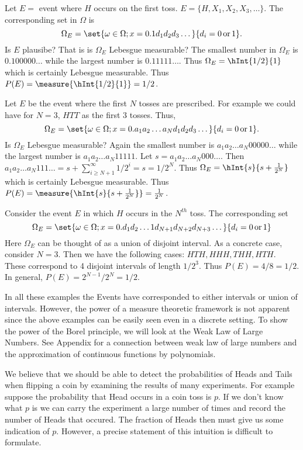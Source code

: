 \begin{Example}
    Let $E = $ event where $H$ occurs on the first toss.
    $E = \lbrace H, X_1, X_2, X_3,\dots \rbrace$. The corresponding set in $\Omega$ is 
    \[\Omega_{E} = \set{\omega\in\Omega; x=0.1d_1d_2d_3\dots}{d_i = 0\,\text{or}\,1}.\]
    Is $E$ plausibe? That is is $\Omega_{E}$ Lebesgue measurable? The smallest number in
    $\Omega_{E}$ is $0.100000\dots$ while the largest number is $0.11111\dots$. Thus
    $\Omega_E = \hInt{1/2}{1}$ which is certainly Lebesgue measurable. Thus $P(E) =
    \measure{\hInt{1/2}{1}} = 1/2$.
\end{Example}
\begin{Example}
    Let $E$ be the event where the first $N$ tosses are prescribed. For example we could have for
    $N=3$, $HTT$ as the first $3$ tosses. Thus,
    \[\Omega_{E} = \set{\omega\in\Omega; x=0.a_1a_2\dots a_{N}d_1d_2d_3\dots}{d_i =
	    0\,\text{or}\,1}.\]
    Is $\Omega_{E}$ Lebesgue measurable? Again the smallest number is $a_1a_2\dots a_N
    00000\dots$ while the largest number is $a_1a_2\dots a_N 11111$. Let $s = a_1a_2\dots
    a_N000\dots$. Then $a_1a_2\dots a_N 111\dots = s + \sum\limits_{i \geq N+1}^{\infty}1/2^{i} = s
    = 1/2^N$. Thus $\Omega_{E} = \hInt{s}{s+\frac{1}{2^N}}$ which is certainly Lebesgue
    measurable. Thus $P(E) = \measure{\hInt{s}{s+\frac{1}{2^N}}} = \frac{1}{2^N}$.
\end{Example}

\begin{Example}
    Consider the event $E$ in which $H$ occurs in the $N^{th}$ toss. The corresponding set 
    \[\Omega_{E} = \set{\omega\in\Omega; x=0.d_1d_2\dots 1 d_{N+1}d_{N+2}d_{N+3}\dots}{d_i =
	    0\,\text{or}\,1}\]
    Here $\Omega_{E}$ can be thought of as a union of disjoint interval. As a concrete case,
    consider $N=3$. Then we have the following cases:
    $HTH,HHH,THH,HTH$. These correspond to 4 disjoint intervals of length $1/2^3$. Thus $P(E) = 4/8
    =1/2$. In general, $P(E) = 2^{N-1}/2^N = 1/2$.
\end{Example}
In all these examples the Events have corresponded to either intervals or union of intervals.
However, the power of a measure theoretic framework is not apparent since the above examples can be
easily seen even in a discrete setting. To show the power of the Borel principle, we will look at
the Weak Law of Large Numbers. See Appendix for a connection between weak law of large numbers and
the approximation of continuous functions by polynomials.

We believe that we should be able to detect the probabilities of Heads and Tails when flipping a
coin by examining the results of many experiments. For example suppose the probability that Head
occurs in a coin toss is $p$. If we don't know what $p$ is we can carry the experiment a large
number of times and record the number of Heads that occured. The fraction of Heads then must give us
some indication of $p$. However, a precise statement of this intuition is difficult to formulate.

